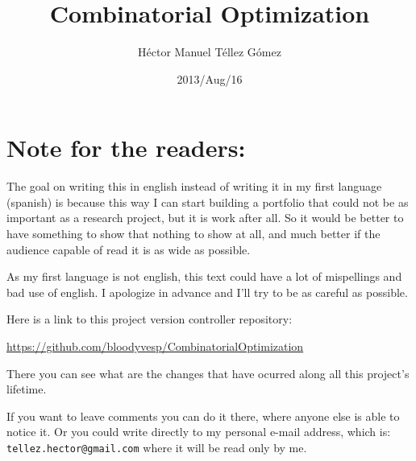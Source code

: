 \frontmatter
\title{Combinatorial Optimization}
\author{Héctor Manuel Téllez Gómez}
\date{2013/Aug/16}
\maketitle

\tableofcontents

\mainmatter
\chapter*{Note for the readers:}
    The goal on writing this in english instead of writing it in my first language (spanish) is because 
    this way I can start building a portfolio that could not be as important as a research project, but
    it is work after all. So it would be better to have something to show that nothing to show at all, 
    and much better if the audience capable of read it is as wide as possible.\pn
    
    As my first language is not english, this text could have a lot of mispellings and
    bad use of english. I apologize in advance and I'll try to be as careful as possible.\pn
    
    Here is a link to this project version controller repository:\par
    \href{https://github.com/bloodyvesp/CombinatorialOptimization}{https://github.com/bloodyvesp/CombinatorialOptimization}\par
    There you can see what are the changes that have ocurred along all this project's lifetime.\pn
    
    If you want to leave comments you can do it there, where anyone else is able to notice it. Or you could 
    write directly to my personal e-mail address, which is: \texttt{tellez.hector@gmail.com} where it will be read only
    by me.
